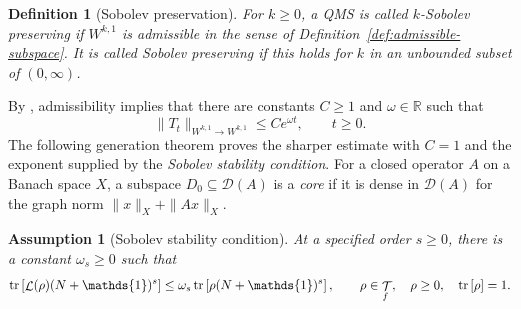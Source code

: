 \documentclass[11pt]{article}
\theoremstyle{myplain}
\newtheorem{stabilityassum}{Assumption}
\theoremstyle{mydefinition}
\newtheorem{defi}[defi]{Definition}
\theoremstyle{remark}
\DeclareMathOperator{\cL}{\mathcal{L}}
\DeclareMathOperator{\cT}{\mathcal{T}}
\DeclareMathOperator{\1}{\mathds{1}}
\newcommand{\tr}[1][]{\operatorname{tr}%
  \ifx#1\empty \else \left[ #1 \right] \fi}
\begin{document}
    \begin{defi}[Sobolev preservation]\label{def:sobolev-preserving-QMS}
        For $k\geq0$, a QMS is called \emph{$k$-Sobolev preserving}
        if $W^{k,1}$ is admissible in the sense of
        Definition~\ref{def:admissible-subspace}. It is called \emph{Sobolev preserving}
        if this holds for $k$ in an unbounded subset of $(0,\infty)$.
    \end{defi}
    By \cite[Prop.~I.5.5]{Engel.2000}, admissibility implies that there
    are constants $C\geq1$ and $\omega\in\mathbb R$ such that
    \begin{equation}\label{eq:single-mode-admissible-semigroup-bound}
        \|T_t\|_{W^{k,1}\to W^{k,1}}\leq Ce^{\omega t},
        \qquad t\geq0.
    \end{equation}
    The following generation theorem proves the sharper estimate with
    $C=1$ and the exponent supplied by the \emph{Sobolev stability condition}. For a closed operator $A$ on a Banach space $X$, a subspace $D_0 \subseteq \mathcal D(A)$ is a \emph{core} if it is dense in
    $\mathcal D(A)$ for the graph norm $\|x\|_X + \|Ax\|_X$.

    \begin{stabilityassum}[Sobolev stability condition]\label{assum:single-mode-stability}
        At a specified order $s \geq 0$, there is a constant
        $\omega_s \geq 0$ such that
        \begin{equation}\label{eq:omega-bound}
            \tr[\cL(\rho)(N + \1)^s]
            \leq \omega_s \tr[\rho(N + \1)^s],
            \qquad \rho \in \cT_f,\quad \rho \geq 0,\quad \tr[\rho] = 1.
        \end{equation}
    \end{stabilityassum}
\end{document}
